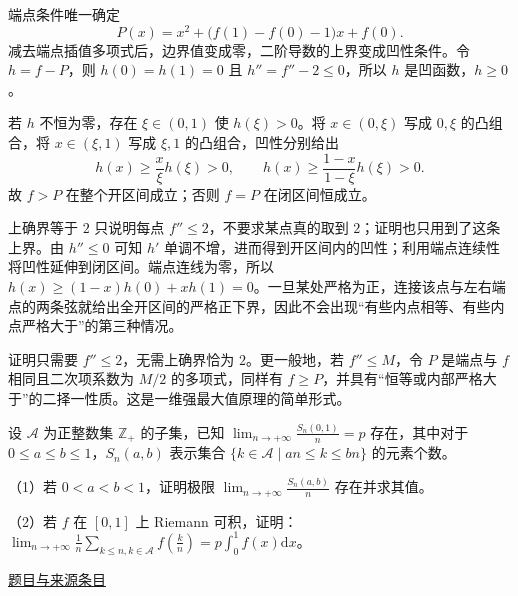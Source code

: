 \documentclass[12pt,fontset=fandol]{ctexart}
\begin{document}
\begin{solve}\label{ans:ch01-17th-A:5}

端点条件唯一确定
\[
P(x)=x^2+\bigl(f(1)-f(0)-1\bigr)x+f(0).
\]
减去端点插值多项式后，边界值变成零，二阶导数的上界变成凹性条件。令 $h=f-P$，则 $h(0)=h(1)=0$ 且 $h''=f''-2\leq0$，所以 $h$ 是凹函数，$h\geq0$。

若 $h$ 不恒为零，存在 $\xi\in(0,1)$ 使 $h(\xi)>0$。将 $x\in(0,\xi)$ 写成 $0,\xi$ 的凸组合，将 $x\in(\xi,1)$ 写成 $\xi,1$ 的凸组合，凹性分别给出
\[
h(x)\geq\frac{x}{\xi}h(\xi)>0,
\qquad
h(x)\geq\frac{1-x}{1-\xi}h(\xi)>0.
\]
故 $f>P$ 在整个开区间成立；否则 $f=P$ 在闭区间恒成立。

上确界等于 $2$ 只说明每点 $f''\le2$，不要求某点真的取到 $2$；证明也只用到了这条上界。由 $h''\le0$ 可知 $h'$ 单调不增，进而得到开区间内的凹性；利用端点连续性将凹性延伸到闭区间。端点连线为零，所以 $h(x)\ge(1-x)h(0)+xh(1)=0$。一旦某处严格为正，连接该点与左右端点的两条弦就给出全开区间的严格正下界，因此不会出现“有些内点相等、有些内点严格大于”的第三种情况。

\end{solve}

\begin{remark}[方法与条件]证明只需要 $f''\leq2$，无需上确界恰为 $2$。更一般地，若 $f''\leq M$，令 $P$ 是端点与 $f$ 相同且二次项系数为 $M/2$ 的多项式，同样有 $f\geq P$，并具有“恒等或内部严格大于”的二择一性质。这是一维强最大值原理的简单形式。\end{remark}

\begin{example}[来源序号6]\label{ex:ch01-17th-A:6}\label{pr:ch01-17th-A:6}

设 $\mathcal{A}$ 为正整数集 $\mathbb{Z}_+$ 的子集，已知 $\lim_{n \rightarrow +\infty} \frac{S_n(0,1)}{n} = p$ 存在，其中对于 $0 \leq a \leq b \leq 1$，$S_n(a,b)$ 表示集合 $\{k \in \mathcal{A} \mid an \leq k \leq bn\}$ 的元素个数。

（1）若 $0 < a < b < 1$，证明极限 $\lim_{n \rightarrow +\infty} \frac{S_n(a,b)}{n}$ 存在并求其值。

（2）若 $f$ 在 $[0,1]$ 上 Riemann 可积，证明：$\lim_{n \rightarrow +\infty} \frac{1}{n} \sum_{k \leq n, k \in \mathcal{A}} f\left(\frac{k}{n}\right) = p \int_0^1 f(x) \mathrm{d}x$。

\par\href{https://github.com/lzxcr/cmc-mathematics/blob/64916fa1fdbc3e444a652eca204d5669058ee321/src/problems/preliminary/17/06.md}{题目与来源条目}

\end{example}
\end{document}
